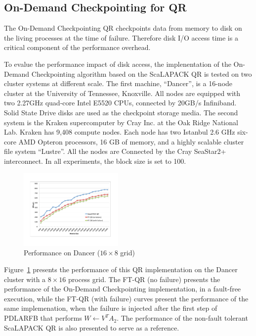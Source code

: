 

\subsection{On-Demand Checkpointing for QR}
The On-Demand Checkpointing QR checkpoints data from memory 
to disk on the living processes at the time of failure. Therefore 
disk I/O access time is a critical component of the performance overhead. 

To evalue the performance impact of disk access, the implenentation of the
On-Demand Checkpointing algorithm based on the ScaLAPACK QR is tested
on two cluster systems at different scale. The first machine,
``Dancer'', is a 16-node cluster at the University of Tennessee,
Knoxville. All nodes are equipped with two 2.27GHz quad-core Intel
E5520 CPUs, connected by 20GB/s Infiniband. Solid State Drive disks
are used as the checkpoint storage media.  The second system is the
Kraken supercomputer by Cray Inc. at the Oak Ridge National Lab.
Kraken has 9,408 compute nodes. Each node has two Istanbul 2.6 GHz
six-core AMD Opteron processors, 16 GB of memory, and a highly
scalable cluster file system ``Lustre''.  All the nodes are Connected
by the Cray SeaStar2+ interconnect.  In all experiments, the block
size is set to 100.

\begin{figure}[tb]
	\centering
	\includegraphics[totalheight=0.25\textheight, width=0.45\textwidth,viewport=70 90 720 530, clip]{figures/dancer_performance}
	\caption{Performance on Dancer ($16\times 8$ grid)}
	\label{fig:dancer_performance}
\end{figure}


Figure~\ref{fig:dancer_performance} presents the performance of this
QR implementation on the Dancer cluster with a $8\times 16$ process
grid.  The FT-QR (no failure) presents the performance of the
On-Demand Checkpointing implementation, in a fault-free execution,
while the FT-QR (with failure) curves present the performance of the
same implemenation, when the failure is injected after the first step
of PDLARFB that performs $W\leftarrow V^{T}A_{2}$. The performance
of the non-fault tolerant ScaLAPACK QR is also presented to
serve as a reference.

